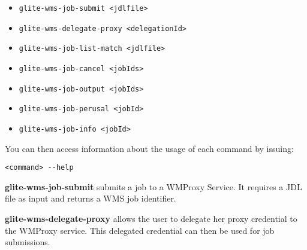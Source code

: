 \begin{itemize}
   \item \begin{verbatim}glite-wms-job-submit <jdlfile>\end{verbatim}
   \item \begin{verbatim}glite-wms-delegate-proxy <delegationId>\end{verbatim}
   \item \begin{verbatim}glite-wms-job-list-match <jdlfile>\end{verbatim}
   \item \begin{verbatim}glite-wms-job-cancel <jobIds>\end{verbatim}
   \item \begin{verbatim}glite-wms-job-output <jobIds>\end{verbatim}
   \item \begin{verbatim}glite-wms-job-perusal <jobId>\end{verbatim}
   \item \begin{verbatim}glite-wms-job-info <jobId> \end{verbatim}  
\end{itemize}


%
%
%
%



You can then access information about the usage of each command by issuing:

\smallskip

\begin{verbatim}
<command> --help
\end{verbatim}

\medskip

\textbf{glite-wms-job-submit}
submits a job to a WMProxy Service. It requires a JDL file
as input and returns a WMS job identifier.

\smallskip

\textbf{glite-wms-delegate-proxy}
allows the user to delegate her proxy credential to the WMProxy service.
This delegated credential can then be used for job submissions.


